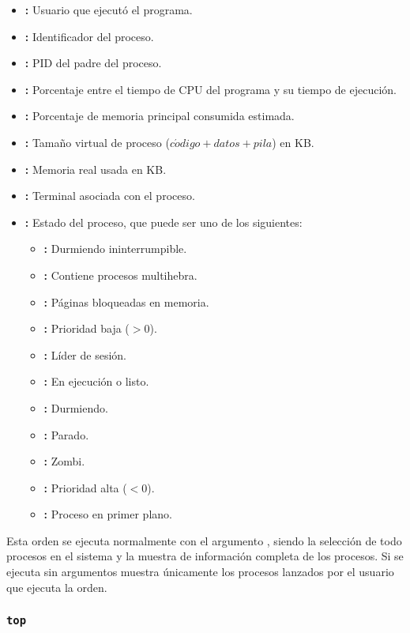\begin{itemize}
	\item{}\textbf{:} Usuario que ejecutó el programa.
	\item{}\textbf{:} Identificador del proceso.
	\item{}\textbf{:} PID del padre del proceso.
	\item{}\textbf{:} Porcentaje entre el tiempo de CPU del programa y su tiempo de ejecución.
	\item{}\textbf{:} Porcentaje de memoria principal consumida estimada.
	\item{}\textbf{:} Tamaño virtual de proceso ($c\acute{o}digo+datos+pila$) en KB\@.
	\item{}\textbf{:} Memoria real usada en KB\@.
	\item{}\textbf{:} Terminal asociada con el proceso.
	\item{}\textbf{:} Estado del proceso, que puede ser uno de los siguientes:
	\begin{itemize}
		\item{}\textbf{:} Durmiendo ininterrumpible.
		\item{}\textbf{:} Contiene procesos multihebra.
		\item{}\textbf{:} Páginas bloqueadas en memoria.
		\item{}\textbf{:} Prioridad baja ($>0$).
		\item{}\textbf{:} Líder de sesión.
		\item{}\textbf{:} En ejecución o listo.
		\item{}\textbf{:} Durmiendo.
		\item{}\textbf{:} Parado.
		\item{}\textbf{:} Zombi.
		\item\code{<}\textbf{:} Prioridad alta ($<0$).
		\item\code{+}\textbf{:} Proceso en primer plano.
	\end{itemize}
\end{itemize}

Esta orden se ejecuta normalmente con el argumento , siendo  la selección de todo procesos en el sistema y  la muestra de información completa de los procesos.
Si se ejecuta sin argumentos muestra únicamente los procesos lanzados por el usuario que ejecuta la orden.

\subsubsection{\texttt{top}}

